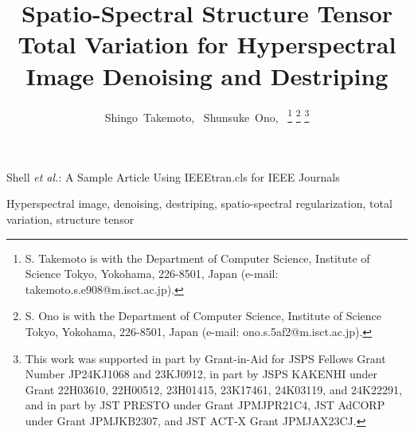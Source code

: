\documentclass[10pt,journal]{IEEEtran}
\begin{document}

\title{Spatio-Spectral Structure Tensor Total Variation for Hyperspectral Image Denoising and Destriping}

\author{Shingo~Takemoto,~
        Shunsuke~Ono,~
\thanks{S. Takemoto is with the Department of Computer Science, Institute of Science Tokyo, Yokohama, 226-8501, Japan (e-mail: takemoto.s.e908@m.isct.ac.jp).}
\thanks{S. Ono is with the Department of Computer Science, Institute of Science Tokyo, Yokohama, 226-8501, Japan (e-mail: ono.s.5af2@m.isct.ac.jp).}%
\thanks{This work was supported in part by Grant-in-Aid for JSPS Fellows Grant Number JP24KJ1068 and 23KJ0912, in part by JSPS KAKENHI under Grant 22H03610, 22H00512, 23H01415, 23K17461, 24K03119, and 24K22291, and in part by JST PRESTO under Grant JPMJPR21C4, JST AdCORP under Grant JPMJKB2307, and JST ACT-X Grant JPMJAX23CJ.}}


%
{Shell \MakeLowercase{\textit{et al.}}: A Sample Article Using IEEEtran.cls for IEEE Journals}


\maketitle



\begin{IEEEkeywords}
Hyperspectral image, denoising, destriping, spatio-spectral regularization, total variation, structure tensor
\end{IEEEkeywords}
\end{document}
